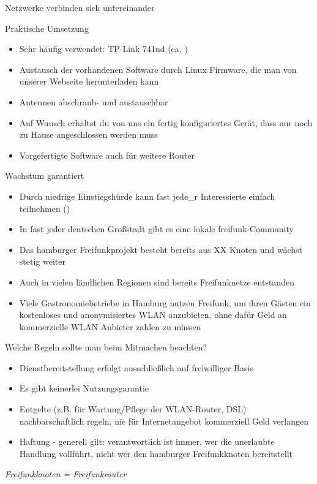 \documentclass[aspectratio=43]{beamer}
\begin{document}
\begin{frame}{Netzwerke verbinden sich untereinander}

\end{frame}

\begin{frame}{Praktische Umsetzung}
	\begin{itemize}
		\item Sehr häufig verwendet: TP-Link 741nd (ca. )
		\item Austausch der vorhandenen Software durch Linux Firmware, die man von unserer Webseite herunterladen kann
		\item Antennen abschraub- und austauschbar
		\item Auf Wunsch erhältst du von uns ein fertig konfiguriertes Gerät, dass nur noch zu Hause angeschlossen werden muss
		\item Vorgefertigte Software auch für weitere Router
	\end{itemize}
\end{frame}

\begin{frame}{Wachstum garantiert}
	\begin{itemize}
		\item Durch niedrige Einstiegshürde kann fast jede\_r Interessierte einfach teilnehmen ()
		\item In fast jeder deutschen Großstadt gibt es eine lokale freifunk-Community
		\item Das hamburger Freifunkprojekt besteht bereits aus XX Knoten und wächst stetig weiter %
		\item Auch in vielen ländlichen Regionen sind bereits Freifunknetze entstanden
		\item Viele Gastronomiebetriebe in Hamburg nutzen Freifunk, um ihren Gästen ein kostenloses und anonymisiertes WLAN anzubieten, ohne dafür Geld an kommerzielle WLAN Anbieter zahlen zu müssen %
	\end{itemize}
\end{frame}

\begin{frame}{Welche Regeln sollte man beim Mitmachen beachten?}
	\begin{itemize}
		\item Dienstbereitstellung erfolgt ausschließlich auf freiwilliger Basis
		\item Es gibt keinerlei Nutzungsgarantie
		\item Entgelte (z.B. für Wartung/Pflege der WLAN-Router, DSL) nachbarschaftlich regeln, nie für Internetangebot kommerziell Geld verlangen
		\item Haftung - generell gilt: verantwortlich ist immer, wer die unerlaubte Handlung vollführt, nicht wer den hamburger Freifunkknoten bereitstellt
	\end{itemize}
	\it{Freifunkknoten = Freifunkrouter} %
\end{frame}
\end{document}
